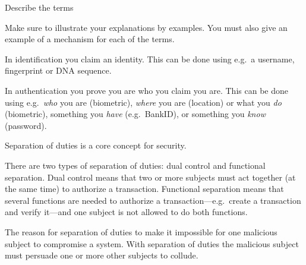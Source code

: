 \question\label{q:auth:E:C}
  Describe the terms
  Make sure to illustrate your explanations by examples.
  You must also give an example of a mechanism for each of the terms.

  \begin{solution}
    In identification you claim an identity.
    This can be done using e.g.~a username, fingerprint or DNA sequence.

    In authentication you prove you are who you claim you are.
    This can be done using e.g.~\emph{who} you are (biometric), \emph{where} 
    you are (location) or what you \emph{do} (biometric), something you 
    \emph{have} (e.g.~BankID), or something you \emph{know} (password).
  \end{solution}


  
\question\label{q:accountability:E:C}
  Separation of duties is a core concept for security.

  \begin{solution}
    There are two types of separation of duties:
    dual control and functional separation.
    Dual control means that two or more subjects must act together (at the same 
    time) to authorize a transaction.
    Functional separation means that several functions are needed to authorize 
    a transaction---e.g.~create a transaction and verify it---and one subject 
    is not allowed to do both functions.

    The reason for separation of duties to make it impossible for one malicious 
    subject to compromise a system.
    With separation of duties the malicious subject must persuade one or more 
    other subjects to collude.
  \end{solution}


